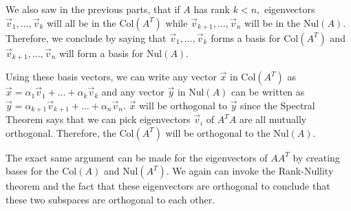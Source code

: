 \begin{enumerate}
{    We also saw in the previous parts, that if $A$ has rank $k < n,$ eigenvectors $\vec{v}_{1}, \dotsc, \vec{v}_{k}$ will all be in the $\text{Col}(A^{T})$ while $\vec{v}_{k+1}, \dotsc, \vec{v}_{n}$ will be in the $\text{Nul}(A).$ Therefore, we conclude by saying that $\vec{v}_{1}, \dotsc, \vec{v}_{k}$ forms a basis for  $\text{Col}(A^{T})$ and $\vec{v}_{k+1}, \dotsc, \vec{v}_{n}$ will form a basis for $\text{Nul}(A).$

    Using these basis vectors, we can write any vector $\vec{x}$ in $\text{Col}(A^{T})$ as $\vec{x} = \alpha_{1} \vec{v}_{1} + \dotsc + \alpha_{k} \vec{v}_{k}$ and any vector $\vec{y}$ in $\text{Nul}(A)$ can be written as $\vec{y} = \alpha_{k+1} \vec{v}_{k+1} + \dotsc + \alpha_{n} \vec{v}_{n}.$ $\vec{x}$ will be orthogonal to $\vec{y}$ since the Spectral Theorem says that we can pick eigenvectors $\vec{v}_{i}$ of $A^{T}A$ are all mutually orthogonal. 
    Therefore, the $\text{Col}(A^{T})$ will be orthogonal to the $\text{Nul}(A).$

    The exact same argument can be made for the eigenvectors of $AA^{T}$ by creating bases for the $\text{Col}(A)$ and $\text{Nul}(A^{T}).$ We again can invoke the Rank-Nullity theorem and the fact that these eigenvectors are orthogonal to conclude that these two subspaces are orthogonal to each other.
  }

\end{enumerate}